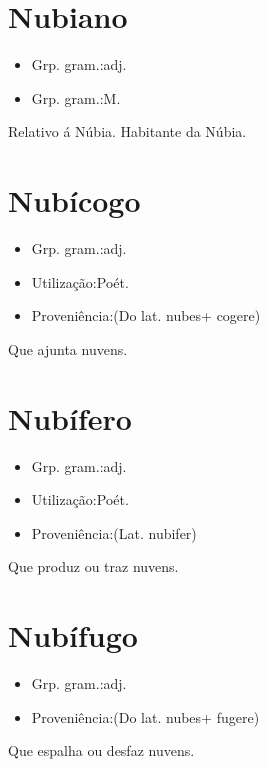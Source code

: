 \section{Nubiano}
\begin{itemize}
\item {Grp. gram.:adj.}
\end{itemize}
\begin{itemize}
\item {Grp. gram.:M.}
\end{itemize}
Relativo á Núbia.
Habitante da Núbia.
\section{Nubícogo}
\begin{itemize}
\item {Grp. gram.:adj.}
\end{itemize}
\begin{itemize}
\item {Utilização:Poét.}
\end{itemize}
\begin{itemize}
\item {Proveniência:(Do lat. \textunderscore nubes\textunderscore  + \textunderscore cogere\textunderscore )}
\end{itemize}
Que ajunta nuvens.
\section{Nubífero}
\begin{itemize}
\item {Grp. gram.:adj.}
\end{itemize}
\begin{itemize}
\item {Utilização:Poét.}
\end{itemize}
\begin{itemize}
\item {Proveniência:(Lat. \textunderscore nubifer\textunderscore )}
\end{itemize}
Que produz ou traz nuvens.
\section{Nubífugo}
\begin{itemize}
\item {Grp. gram.:adj.}
\end{itemize}
\begin{itemize}
\item {Proveniência:(Do lat. \textunderscore nubes\textunderscore  + \textunderscore fugere\textunderscore )}
\end{itemize}
Que espalha ou desfaz nuvens.
